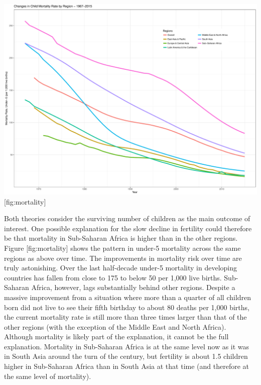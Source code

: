 \documentclass[]{article}
\begin{document}
\includegraphics{../figures/childMortalityRates.pdf} {[}fig:mortality{]}

Both theories consider the surviving number of children as the main outcome of interest. One possible explanation for the slow decline in fertility could therefore be that mortality in Sub-Saharan Africa is higher than in the other regions. Figure {[}fig:mortality{]} shows the pattern in under-5 mortality across the same regions as above over time. The improvements in mortality risk over time are truly astonishing. Over the last half-decade under-5 mortality in developing countries has fallen from close to 175 to below 50 per 1,000 live births. Sub-Saharan Africa, however, lags substantially behind other regions. Despite a massive improvement from a situation where more than a quarter of all children born did not live to see their fifth birthday to about 80 deaths per 1,000 births, the current mortality rate is still more than three times larger than that of the other regions (with the exception of the Middle East and North Africa). Although mortality is likely part of the explanation, it cannot be the full explanation. Mortality in Sub-Saharan Africa is at the same level now as it was in South Asia around the turn of the century, but fertility is about 1.5 children higher in Sub-Saharan Africa than in South Asia at that time (and therefore at the same level of mortality).
\end{document}
